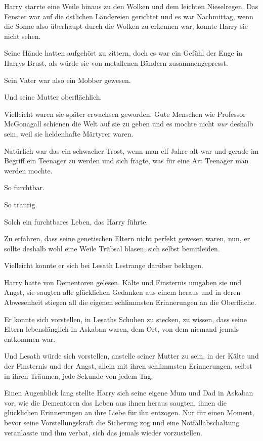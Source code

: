 {Harry starrte eine Weile hinaus zu den Wolken und dem leichten Nieselregen. Das Fenster war auf die östlichen Ländereien gerichtet und es war Nachmittag, wenn die Sonne also überhaupt durch die Wolken zu erkennen war, konnte Harry sie nicht sehen.

Seine Hände hatten aufgehört zu zittern, doch es war ein Gefühl der Enge in Harrys Brust, als würde sie von metallenen Bändern zusammengepresst.

Sein Vater war also ein Mobber gewesen.

Und seine Mutter oberflächlich.

Vielleicht waren sie später erwachsen geworden. Gute Menschen wie Professor McGonagall schienen die Welt auf sie zu geben und es mochte nicht \emph{nur} deshalb sein, weil sie heldenhafte Märtyrer waren.

Natürlich war das ein schwacher Trost, wenn man elf Jahre alt war und gerade im Begriff ein Teenager zu werden und sich fragte, was für eine Art Teenager man werden mochte.

So furchtbar.

So traurig.

Solch ein furchtbares Leben, das Harry führte.

Zu erfahren, dass seine genetischen Eltern nicht perfekt gewesen waren, nun, er sollte deshalb wohl eine Weile Trübsal blasen, sich selbst bemitleiden.

Vielleicht konnte er sich bei Lesath Lestrange darüber beklagen.

Harry hatte von Dementoren gelesen. Kälte und Finsternis umgaben sie und Angst, sie saugten alle glücklichen Gedanken aus einem heraus und in deren Abwesenheit stiegen all die eigenen schlimmsten Erinnerungen an die Oberfläche.

Er konnte sich vorstellen, in Lesaths Schuhen zu stecken, zu wissen, dass seine Eltern lebenslänglich in Askaban waren, dem Ort, von dem niemand jemals entkommen war.

Und Lesath würde sich vorstellen, anstelle seiner Mutter zu sein, in der Kälte und der Finsternis und der Angst, allein mit ihren schlimmsten Erinnerungen, selbst in ihren Träumen, jede Sekunde von jedem Tag.

Einen Augenblick lang stellte Harry sich seine eigene Mum und Dad in Askaban vor, wie die Dementoren das Leben aus ihnen heraus saugten, ihnen die glücklichen Erinnerungen an ihre Liebe für ihn entzogen. Nur für einen Moment, bevor seine Vorstellungskraft die Sicherung zog und eine Notfallabschaltung veranlasste und ihm verbat, sich das jemals wieder vorzustellen.

}
